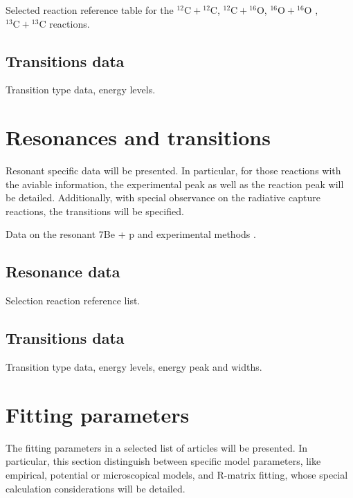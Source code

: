 \documentclass[openany]{book}
\begin{document}
Selected reaction reference table for the $\mathrm{{}^{12}C + {}^{12}C}$, $\mathrm{{}^{12}C + {}^{16}O}$,  $\mathrm{{}^{16}O + {}^{16}O}$ ,  $\mathrm{{}^{13}C + {}^{13}C}$ reactions. 

\subsection{Transitions data} \label{sub:TransitionsData}

Transition type data, energy levels. 

\section{Resonances and transitions} \label{sec:resonancesTransitions}

Resonant specific data will be presented. In particular, for those reactions with the aviable information, the experimental peak as well as the reaction peak will be detailed. Additionally, with special observance on the radiative capture reactions, the transitions will be specified.

Data on the resonant 7Be + p and experimental methods \cite{buompane_dileva_gialanella_d'onofrio_decesare_duarte_fulop_gasques_gyurky_morales-gallegos_et_2022}.

\subsection{Resonance data}  \label{sub:ResonanceData}

Selection reaction reference list.

\subsection{Transitions data} \label{sub:Transitions2Data}

Transition type data, energy levels, energy peak and widths.

\section{Fitting parameters} \label{sec:fittingParams}

The fitting parameters in a selected list of articles will be presented. In particular, this section distinguish between specific model parameters, like empirical, potential or microscopical models, and R-matrix fitting, whose special calculation considerations will be detailed.
\end{document}
